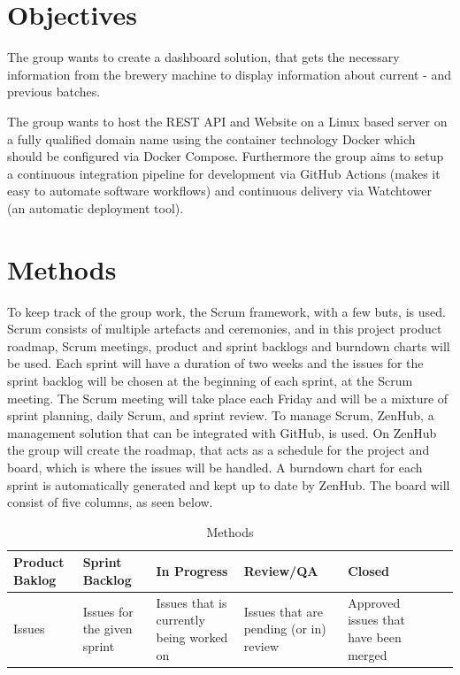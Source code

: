 \section{Objectives}
The group wants to create a dashboard solution, that gets the necessary
information from the brewery machine to display information about current - and
previous batches.

The group wants to host the REST API and Website on a Linux based server on a
fully qualified domain name using the container technology Docker which should
be configured via Docker Compose. Furthermore the group aims to setup a
continuous integration pipeline for development via GitHub Actions (makes it
easy to automate software workflows) and continuous delivery via Watchtower (an
automatic deployment tool).

\section{Methods}
To keep track of the group work, the Scrum framework, with a few buts, is used.
Scrum consists of multiple artefacts and ceremonies, and in this project product
roadmap, Scrum meetings, product and sprint backlogs and burndown charts will
be used. Each sprint will have a duration of two weeks and the issues for the
sprint backlog will be chosen at the beginning of each sprint, at the Scrum
meeting. The Scrum meeting will take place each Friday and will be a mixture of
sprint planning, daily Scrum, and sprint review. To manage Scrum, ZenHub, a
management solution that can be integrated with GitHub, is used. On ZenHub the
group will create the roadmap, that acts as a schedule for the project and
board, which is where the issues will be handled. A burndown chart for each
sprint is automatically generated and kept up to date by ZenHub. The board will
consist of five columns, as seen below.

\begin{table}[H]
    \begin{tabularx}{\textwidth}{|>{\RaggedRight}X|>{\RaggedRight}X|>{\RaggedRight}X|>{\RaggedRight}X|>{\RaggedRight}X|>{\RaggedRight}X|>{\RaggedRight}X|}
        \hline                             
        Product Baklog & Sprint Backlog & In Progress & Review/QA & Closed \\
        \hline
        Issues & Issues for the given sprint & Issues that is currently being worked on & Issues that are pending (or in) review & Approved issues that have been merged    \\
        \hline
    \end{tabularx}
    \caption{Methods} 
    \label{table:Methods}
\end{table} 

